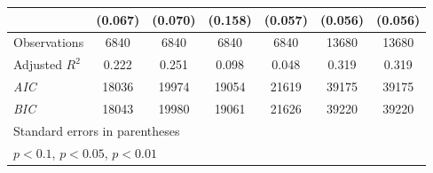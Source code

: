 {\begin{tabular}{l*{6}{c}}
                    &     (0.067)         &     (0.070)         &     (0.158)         &     (0.057)         &     (0.056)         &     (0.056)         \\
\hline
Observations        &        6840         &        6840         &        6840         &        6840         &       13680         &       13680         \\
Adjusted \(R^{2}\)  &       0.222         &       0.251         &       0.098         &       0.048         &       0.319         &       0.319         \\
\textit{AIC}        &       18036         &       19974         &       19054         &       21619         &       39175         &       39175         \\
\textit{BIC}        &       18043         &       19980         &       19061         &       21626         &       39220         &       39220         \\
\hline\hline
\multicolumn{7}{l}{\footnotesize Standard errors in parentheses}\\
\multicolumn{7}{l}{\footnotesize \sym{*} \(p<0.1\), \sym{**} \(p<0.05\), \sym{***} \(p<0.01\)}\\
\end{tabular}
}
